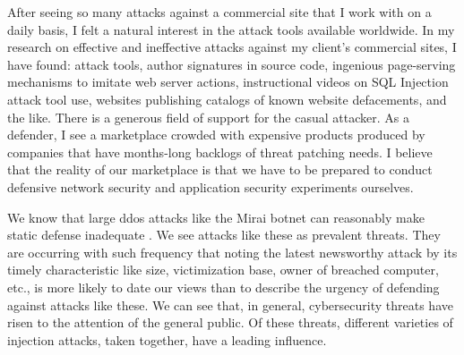 After seeing so many attacks against a commercial site that I work with on a daily basis, I felt a natural interest in the \gls{attack} tools available worldwide.  In my research on effective and ineffective attacks against my client's commercial sites, I have found:  \gls{attack} tools, author signatures in source code, ingenious page-serving mechanisms to imitate web server actions, instructional videos on SQL Injection \gls{attack} tool use, websites publishing catalogs of known website defacements, and the like.  There is a generous field of support for the casual attacker.  As a defender, I see a marketplace crowded with expensive products produced by companies that have months-long backlogs of \gls{threat} patching needs.  I believe that the reality of our marketplace is that we have to be prepared to conduct defensive network security and application security experiments ourselves.

We know that large \gls{ddos} attacks like the Mirai \gls{botnet} can reasonably make static defense inadequate .  We see attacks like these as prevalent threats.  They are occurring with such frequency that noting the latest newsworthy \gls{attack} by its timely characteristic like size, victimization base, owner of breached computer, etc., is more likely to date our views than to describe the urgency of defending against attacks like these.  We can see that, in general, cybersecurity threats have risen to the attention of the general public.  Of these threats, different varieties of injection attacks, taken together, have a leading influence.

